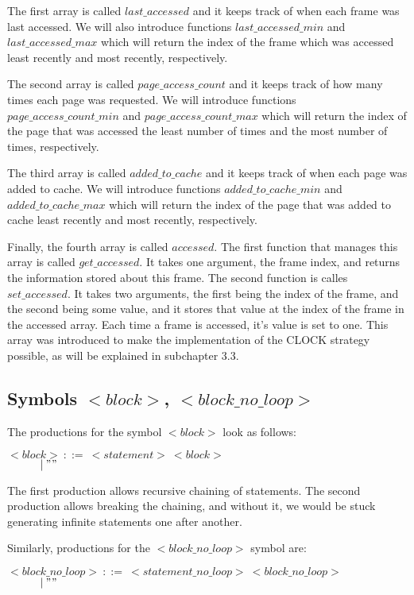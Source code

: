 The first array is called $last\_accessed$ and it keeps track of when each frame was last accessed. We will also introduce functions $last\_accessed\_min$ and $last\_accessed\_max$ which will return the index of the frame which was accessed least recently and most recently, respectively.

The second array is called $page\_access\_count$ and it keeps track of how many times each page was requested. We will introduce functions $page\_access\_count\_min$ and $page\_access\_count\_max$ which will return the index of the page that was accessed the least number of times and the most number of times, respectively.

The third array is called $added\_to\_cache$ and it keeps track of when each page was added to cache. We will introduce functions $added\_to\_cache\_min$ and $added\_to\_cache\_max$ which will return the index of the page that was added to cache least recently and most recently, respectively.

Finally, the fourth array is called $accessed$. The first function that manages this array is called $get\_accessed$. It takes one argument, the frame index, and returns the information stored about this frame. The second function is calles $set\_accessed$. It takes two arguments, the first being the index of the frame, and the second being some value, and it stores that value at the index of the frame in the accessed array. Each time a frame is accessed, it's value is set to one. This array was introduced to make the implementation of the CLOCK strategy possible, as will be explained in subchapter 3.3.

\subsection{Symbols ${<}block{>}$, ${<}block\_no\_loop{>}$}
The productions for the symbol ${<}block{>}$ look as follows:

\noindent
$ {<}block{>}\:::=\:{<}statement{>}\:{<}block{>}$\\
$ \indent\indent |\:""$

The first production allows recursive chaining of statements. The second production allows breaking the chaining, and without it, we would be stuck generating infinite statements one after another.

Similarly, productions for the ${<}block\_no\_loop{>}$ symbol are:

\noindent
$ {<}block\_no\_loop{>}\:::=\:{<}statement\_no\_loop{>}\:{<}block\_no\_loop{>}$\\
$ \indent\indent |\:""$

